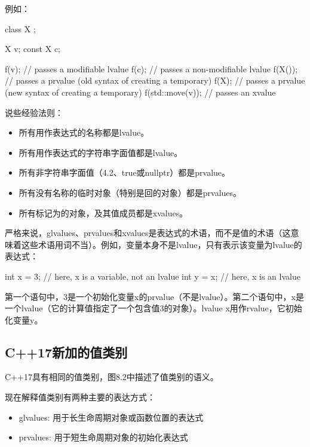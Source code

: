 例如：

\begin{cppcode}
class X {
};

X v;
const X c;

f(v); // passes a modifiable lvalue
f(c); // passes a non-modifiable lvalue
f(X()); // passes a prvalue (old syntax of creating a temporary)
f(X{}); // passes a prvalue (new syntax of creating a temporary)
f(std::move(v)); // passes an xvalue
\end{cppcode}

说些经验法则：

\begin{itemize}
	\item 所有用作表达式的名称都是lvalue。
	\item 所有用作表达式的字符串字面值都是lvalue。
	\item 所有非字符串字面值（4.2、true或nullptr）都是prvalue。
	\item 所有没有名称的临时对象（特别是回的对象）都是prvalues。
	\item 所有标记为的对象，及其值成员都是xvalues。
\end{itemize}

严格来说，glvalues、prvalues和xvalues是表达式的术语，而不是值的术语（这意味着这些术语用词不当）。例如，变量本身不是lvalue，只有表示该变量为lvalue的表达式：

\begin{cppcode}
int x = 3; // here, x is a variable, not an lvalue
int y = x; // here, x is an lvalue
\end{cppcode}

第一个语句中，3是一个初始化变量x的prvalue（不是lvalue）。第二个语句中，x是一个lvalue（它的计算值指定了一个包含值3的对象）。lvalue x用作rvalue，它初始化变量y。

\subsection{C++17新加的值类别}

C++17具有相同的值类别，图8.2中描述了值类别的语义。

现在解释值类别有两种主要的表达方式：

\begin{itemize}
	\item glvalues: 用于长生命周期对象或函数位置的表达式
	\item prvalues: 用于短生命周期对象的初始化表达式
\end{itemize}

